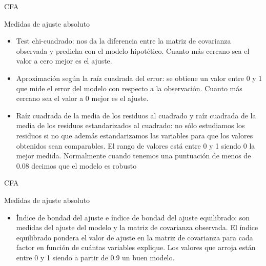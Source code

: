\documentclass[10pt]{beamer}
\begin{document}
\begin{frame}[fragile]{CFA}
\vspace{10px}
\pause
{}
\begin{block}{Medidas de ajuste absoluto}
	\begin{itemize}
		\item Test chi-cuadrado: nos da la diferencia entre la matriz de covarianza observada y predicha con el modelo hipotético. Cuanto más cercano sea el valor a cero mejor es el ajuste.
		\item Aproximación según la raíz cuadrada del error: se obtiene un valor entre 0 y 1 que mide el error del modelo con respecto a la observación. Cuanto más cercano sea el valor a 0 mejor es el ajuste.
		\item Raíz cuadrada de la media de los residuos al cuadrado y raíz cuadrada de la media de los residuos estandarizados al cuadrado: no sólo estudiamos los residuos si no que además estandarizamos las variables para que los valores obtenidos sean comparables. El rango de valores está entre 0 y 1 siendo 0 la mejor medida. Normalmente cuando tenemos una puntuación de menos de 0.08 decimos que el modelo es robusto
	\end{itemize}
\end{block}
\end{frame}

\begin{frame}[fragile]{CFA}
\vspace{10px}
\pause
{}
\begin{block}{Medidas de ajuste absoluto}
	\begin{itemize}
		\item Índice de bondad del ajuste e índice de bondad del ajuste equilibrado: son medidas del ajuste del modelo y la matriz de covarianza observada. El índice equilibrado pondera el valor de ajuste en la matriz de covarianza para cada factor en función de cuántas variables explique. Los valores que arroja están entre 0 y 1 siendo a partir de 0.9 un buen modelo.
	\end{itemize}
\end{block}
\end{frame}
\end{document}
